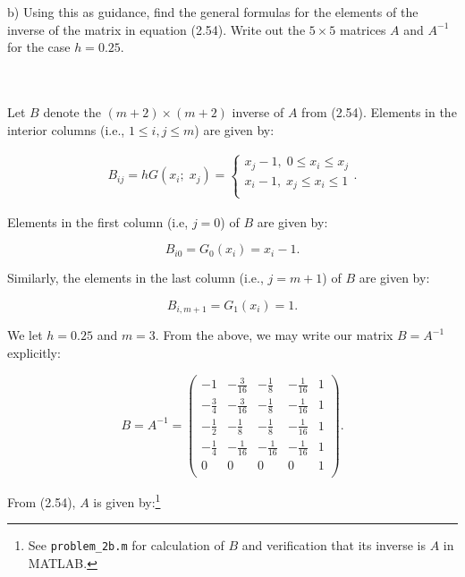 \pagebreak
b) Using this as guidance, find the general formulas for the elements of the inverse of the matrix in equation (2.54).
   Write out the $5 \times 5$ matrices $A$ and $A^{-1}$ for the case $h = 0.25$.

\begin{solution}\ \\\\
    Let $B$ denote the $(m+2) \times (m+2)$ inverse of $A$ from (2.54). Elements in the interior columns 
    (i.e., $1 \le i,j \le m$) are given by:

    \begin{align*}
    B_{ij} = hG(x_i;\; x_j) = \begin{cases}
                                x_j - 1,\; 0 \le x_i \le x_j \\
                                x_i - 1,\; x_j \le x_i \le 1 \\
                            \end{cases}.
    \end{align*}

    Elements in the first column (i.e, $j = 0$) of $B$ are given by:

    $$
    B_{i0} = G_0(x_i) = x_i - 1.
    $$

    Similarly, the elements in the last column (i.e., $j = m + 1$) of $B$ are given by:

    $$
    B_{i,m+1} = G_1(x_i) = 1.
    $$

    We let $h = 0.25$ and $m = 3$. From the above, we may write our matrix $B = A^{-1}$ explicitly:


    \begingroup
    \renewcommand*{\arraystretch}{1.5}
    $$
        B =A^{-1} =
        \begin{pmatrix}
                      -1 & -\frac{3}{16} &  -\frac{1}{8} & -\frac{1}{16} & 1 \\
            -\frac{3}{4} & -\frac{3}{16} &  -\frac{1}{8} & -\frac{1}{16} & 1 \\
            -\frac{1}{2} &  -\frac{1}{8} &  -\frac{1}{8} & -\frac{1}{16} & 1 \\
            -\frac{1}{4} & -\frac{1}{16} & -\frac{1}{16} & -\frac{1}{16} & 1 \\
                       0 &             0 &             0 &             0 & 1 \\
        \end{pmatrix}.
    $$
    \endgroup

    From (2.54), $A$ is given by:\footnote{
        See \texttt{problem\_2b.m} for calculation of $B$ and verification that its inverse is $A$ in MATLAB.
    }


\end{solution}
